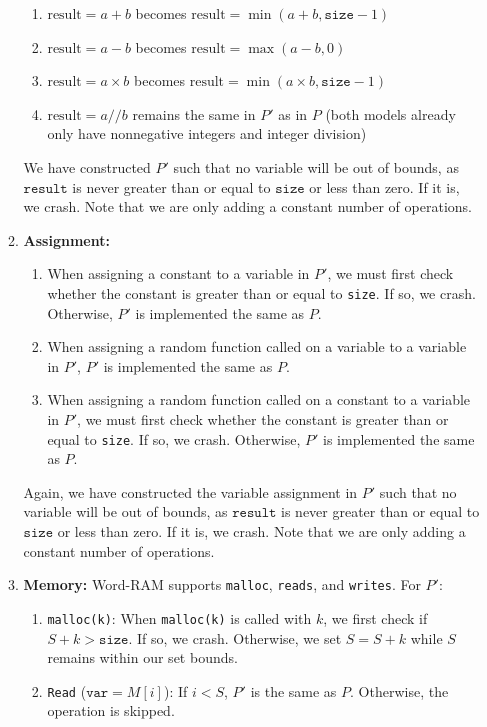 \documentclass[11pt]{article}
\begin{document}
\begin{enumerate}
\begin{enumerate}
\begin{enumerate}
        \item $\text{result} = a + b$ becomes $\text{result} = \min(a + b, \texttt{size} - 1)$
        \item $\text{result} = a - b$ becomes $\text{result} = \max(a - b, 0)$
        \item $\text{result} = a \times b$ becomes $\text{result} = \min(a \times b, \texttt{size} - 1)$
        \item $\text{result} = a // b$ remains the same in $P'$ as in $P$ (both models already only have nonnegative integers and integer division)
    \end{enumerate}
    We have constructed $P'$ such that no variable will be out of bounds, as $\texttt{result}$ is never greater than or equal to $\texttt{size}$ or less than zero. If it is, we crash. Note that we are only adding a constant number of operations.
    \item \textbf{Assignment: } 
    \begin{enumerate}  
        \item When assigning a constant to a variable in $P'$, we must first check whether the constant is greater than or equal to \texttt{size}. If so, we crash. Otherwise, $P'$ is implemented the same as $P$.
        \item When assigning a random function called on a variable to a variable in $P'$, $P'$ is implemented the same as $P$.
        \item When assigning a random function called on a constant to a variable in $P'$, we must first check whether the constant is greater than or equal to \texttt{size}. If so, we crash. Otherwise, $P'$ is implemented the same as $P$.
    \end{enumerate}
    Again, we have constructed the variable assignment in $P'$ such that no variable will be out of bounds, as $\texttt{result}$ is never greater than or equal to $\texttt{size}$ or less than zero. If it is, we crash. Note that we are only adding a constant number of operations.
    \item \textbf{Memory: } Word-RAM supports \texttt{malloc}, \texttt{reads}, and \texttt{writes}. For $P'$:
    \begin{enumerate}
        \item \texttt{malloc(k)}: When \texttt{malloc(k)} is called with $k$, we first check if $S + k > \texttt{size}$. If so, we crash. Otherwise, we set $S = S + k$ while $S$ remains within our set bounds.
        \item \texttt{Read} ($\texttt{var} = M[i]$): If $i < S$, $P'$ is the same as $P$. Otherwise, the operation is skipped.

\end{enumerate}
\end{enumerate}
\end{enumerate}
\end{document}
